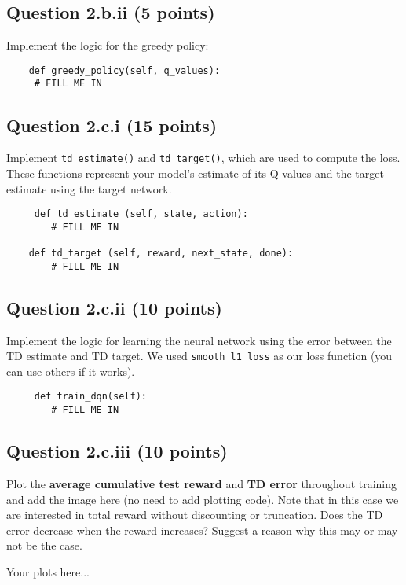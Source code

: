 \documentclass[12pt]{article}
\begin{document}
\subsection*{Question 2.b.ii (5 points)} 
Implement the logic for the greedy policy:
\begin{solution}
    \begin{verbatim}
    def greedy_policy(self, q_values):
     # FILL ME IN
    \end{verbatim}
\end{solution}



\subsection*{Question 2.c.i (15 points)} Implement \texttt{td\_estimate()} and \texttt{td\_target()}, which are used to compute the loss. These functions represent your model's estimate of its Q-values and the target-estimate using the target network. 

\begin{solution}
    \begin{verbatim}
     def td_estimate (self, state, action):
        # FILL ME IN

    def td_target (self, reward, next_state, done):
        # FILL ME IN
    \end{verbatim}
\end{solution}

\subsection*{Question 2.c.ii (10 points)} Implement the logic for learning the neural network using the error between the TD estimate and TD target. We used \texttt{smooth\_l1\_loss} as our loss function (you can use others if it works).

\begin{solution}
    \begin{verbatim}
     def train_dqn(self):
        # FILL ME IN
    \end{verbatim}
\end{solution}

\subsection*{Question 2.c.iii (10 points)} Plot the \textbf{average cumulative test reward} and \textbf{TD error} throughout training and add the image here (no need to add plotting code). Note that in this case we are interested in total reward without discounting or truncation. Does the TD error decrease when the reward increases? Suggest a reason why this may or may not be the case.
\begin{solution}
Your plots here...
\end{solution}
\end{document}

